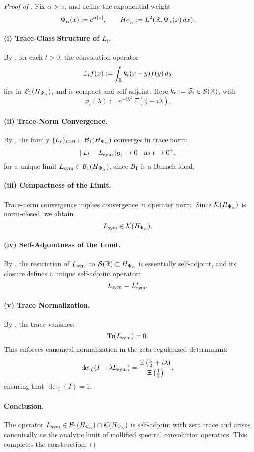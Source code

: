 \begin{proof}[Proof of ]
Fix \( \alpha > \pi \), and define the exponential weight
\[
\Psi_\alpha(x) := e^{\alpha |x|}, \qquad H_{\Psi_\alpha} := L^2(\mathbb{R}, \Psi_\alpha(x)\, dx).
\]

\paragraph{(i) Trace-Class Structure of \( L_t \).}
By , for each \( t > 0 \), the convolution operator
\[
L_t f(x) := \int_{\mathbb{R}} k_t(x - y) f(y)\, dy
\]
lies in \( \mathcal{B}_1(H_{\Psi_\alpha}) \), and is compact and self-adjoint. Here \( k_t := \widehat{\varphi_t} \in \mathcal{S}(\mathbb{R}) \), with
\[
\varphi_t(\lambda) := e^{-t\lambda^2} \, \Xi\left( \tfrac{1}{2} + i\lambda \right).
\]

\paragraph{(ii) Trace-Norm Convergence.}
By , the family \( \{L_t\}_{t > 0} \subset \mathcal{B}_1(H_{\Psi_\alpha}) \) converges in trace norm:
\[
\| L_t - L_{\mathrm{sym}} \|_{\mathcal{B}_1} \to 0 \quad \text{as } t \to 0^+,
\]
for a unique limit \( L_{\mathrm{sym}} \in \mathcal{B}_1(H_{\Psi_\alpha}) \), since \( \mathcal{B}_1 \) is a Banach ideal.

\paragraph{(iii) Compactness of the Limit.}
Trace-norm convergence implies convergence in operator norm. Since \( \mathcal{K}(H_{\Psi_\alpha}) \) is norm-closed, we obtain
\[
L_{\mathrm{sym}} \in \mathcal{K}(H_{\Psi_\alpha}).
\]

\paragraph{(iv) Self-Adjointness of the Limit.}
By , the restriction of \( L_{\mathrm{sym}} \) to \( \mathcal{S}(\mathbb{R}) \subset H_{\Psi_\alpha} \) is essentially self-adjoint, and its closure defines a unique self-adjoint operator:
\[
L_{\mathrm{sym}} = L_{\mathrm{sym}}^*.
\]

\paragraph{(v) Trace Normalization.}
By , the trace vanishes:
\[
\operatorname{Tr}(L_{\mathrm{sym}}) = 0.
\]
This enforces canonical normalization in the zeta-regularized determinant:
\[
\det\nolimits_{\zeta}(I - \lambda L_{\mathrm{sym}}) = \frac{\Xi\left( \tfrac{1}{2} + i\lambda \right)}{\Xi\left( \tfrac{1}{2} \right)},
\]
ensuring that \( \det\nolimits_{\zeta}(I) = 1 \).

\paragraph{Conclusion.}
The operator \( L_{\mathrm{sym}} \in \mathcal{B}_1(H_{\Psi_\alpha}) \cap \mathcal{K}(H_{\Psi_\alpha}) \) is self-adjoint with zero trace and arises canonically as the analytic limit of mollified spectral convolution operators. This completes the construction.
\end{proof}
